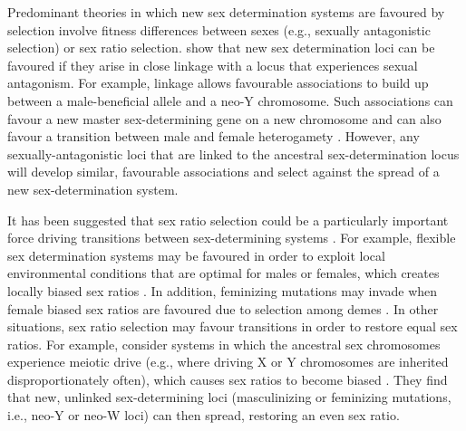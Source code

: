 \documentclass[12pt]{article}
\begin{document}


Predominant theories in which new sex determination systems are favoured by selection involve fitness differences between sexes (e.g., sexually antagonistic selection) or sex ratio selection.
\citet{vanDoorn:2007eu,vanDoorn:2010hu} show that new sex determination loci can be favoured if they arise in close linkage with a locus that experiences sexual antagonism. 
For example, linkage allows favourable associations to build up between a male-beneficial allele and a neo-Y chromosome. 
Such associations can favour a new master sex-determining gene on a new chromosome \citep{vanDoorn:2007eu} and can also favour a transition between male and female heterogamety \citep[e.g., a ZW to XY transition,][]{vanDoorn:2010hu}.
However, any sexually-antagonistic loci that are linked to the ancestral sex-determination locus will develop similar, favourable associations and select against the spread of a new sex-determination system. 

It has been suggested that sex ratio selection could be a particularly important force driving transitions between sex-determining systems \citep[Chapter 7]{Beukeboom:2014vb}. 
For example, flexible sex determination systems may be favoured in order to exploit local environmental conditions that are optimal for males or females, which creates locally biased sex ratios \citep{Charnov:1977tx,Werren:1984tl,Pen:2010kk}. 
In addition, feminizing mutations may invade when female biased sex ratios are favoured due to selection among demes \citep{Wilson:1981vm,Vuillleumier:2007bh}. 
In other situations, sex ratio selection may favour transitions in order to restore equal sex ratios. 
For example, \citet{Kozielska:2010vm} consider systems in which the ancestral sex chromosomes experience meiotic drive (e.g., where driving X or Y chromosomes are inherited disproportionately often), which causes sex ratios to become biased \citep{Hamilton:1967ts}. 
They find that new, unlinked sex-determining loci (masculinizing or feminizing mutations, i.e., neo-Y or neo-W loci) can then spread, restoring an even sex ratio. 
\end{document}
